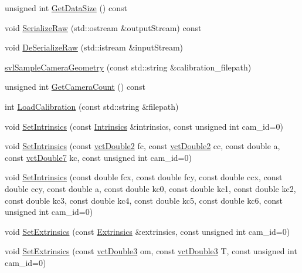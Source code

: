 \begin{DoxyCompactItemize}
\item 
unsigned int \hyperlink{classsvl_sample_camera_geometry_a4255f71f2a1c2068f0781075c73b3a1c}{Get\+Data\+Size} () const 
\item 
void \hyperlink{classsvl_sample_camera_geometry_ab9fab60b3c61042532b4818022321c2f}{Serialize\+Raw} (std\+::ostream \&output\+Stream) const 
\item 
void \hyperlink{classsvl_sample_camera_geometry_a18e5668507b1836a75f180a79c0fda3a}{De\+Serialize\+Raw} (std\+::istream \&input\+Stream)
\item 
\hyperlink{classsvl_sample_camera_geometry_a5577cd124727bfb6306a5c66a589b921}{svl\+Sample\+Camera\+Geometry} (const std\+::string \&calibration\+\_\+filepath)
\item 
unsigned int \hyperlink{classsvl_sample_camera_geometry_abf0ecec96daa5725aadb14396eaf071c}{Get\+Camera\+Count} () const 
\item 
int \hyperlink{classsvl_sample_camera_geometry_a18081b03a7bbb4f21181da0cdd4e610d}{Load\+Calibration} (const std\+::string \&filepath)
\item 
void \hyperlink{classsvl_sample_camera_geometry_a7ca3c9b9a41c91371b8b1b1b224e655e}{Set\+Intrinsics} (const \hyperlink{structsvl_sample_camera_geometry_1_1_intrinsics}{Intrinsics} \&intrinsics, const unsigned int cam\+\_\+id=0)
\item 
void \hyperlink{classsvl_sample_camera_geometry_adc5e18eef19cb2bebd85c61ca62f1652}{Set\+Intrinsics} (const \hyperlink{vct_fixed_size_vector_types_8h_afc0fdcc41cbe8b043747612501610812}{vct\+Double2} fc, const \hyperlink{vct_fixed_size_vector_types_8h_afc0fdcc41cbe8b043747612501610812}{vct\+Double2} cc, const double a, const \hyperlink{vct_fixed_size_vector_types_8h_a600a52ac438879e14dd78db8002d2681}{vct\+Double7} kc, const unsigned int cam\+\_\+id=0)
\item 
void \hyperlink{classsvl_sample_camera_geometry_a47cf52390725803f085786c2fc3780f6}{Set\+Intrinsics} (const double fcx, const double fcy, const double ccx, const double ccy, const double a, const double kc0, const double kc1, const double kc2, const double kc3, const double kc4, const double kc5, const double kc6, const unsigned int cam\+\_\+id=0)
\item 
void \hyperlink{classsvl_sample_camera_geometry_ad5990f89b0b86ba5c7bdcb1c7b7c8802}{Set\+Extrinsics} (const \hyperlink{structsvl_sample_camera_geometry_1_1_extrinsics}{Extrinsics} \&extrinsics, const unsigned int cam\+\_\+id=0)
\item 
void \hyperlink{classsvl_sample_camera_geometry_a16f3e94ec626159f66af0c1e67cb9d0b}{Set\+Extrinsics} (const \hyperlink{vct_fixed_size_vector_types_8h_a4a89122c9d7f72c3f31fe8126e17c3af}{vct\+Double3} om, const \hyperlink{vct_fixed_size_vector_types_8h_a4a89122c9d7f72c3f31fe8126e17c3af}{vct\+Double3} T, const unsigned int cam\+\_\+id=0)

\end{DoxyCompactItemize}
